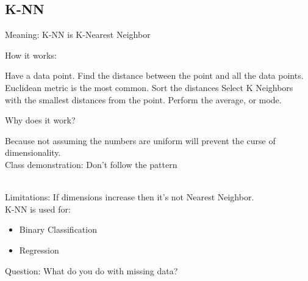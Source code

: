 \subsection{K-NN}
Meaning: K-NN is K-Nearest Neighbor

How it works: 
\begin{outline}[enumerate]
    \1  Have a data point. 
    \1 Find the distance between the point and all the data points. Euclidean metric is the most common.
    \1 Sort the distances
    \1 Select K Neighbors with the smallest distances from the point.
    \1 Perform the average, or mode.
\end{outline}

Why does it work?

Because not assuming the numbers are uniform will prevent the curse of dimensionality. \\

Class demonstration: Don't follow the pattern\\
 \\

Limitations: If dimensions increase then it's not Nearest Neighbor. \\

K-NN is used for: 
\begin{itemize}
    \item Binary Classification
    \item Regression
\end{itemize}
Question: What do you do with missing data?


